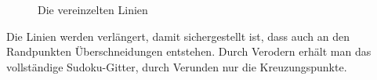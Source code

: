 \begin{figure}[h!]
    \hfill
    \caption{Die vereinzelten Linien}
\end{figure}

Die Linien werden verlängert, damit sichergestellt ist, dass auch an den Randpunkten Überschneidungen entstehen.
Durch Verodern erhält man das vollständige Sudoku-Gitter, durch Verunden nur die Kreuzungspunkte.

